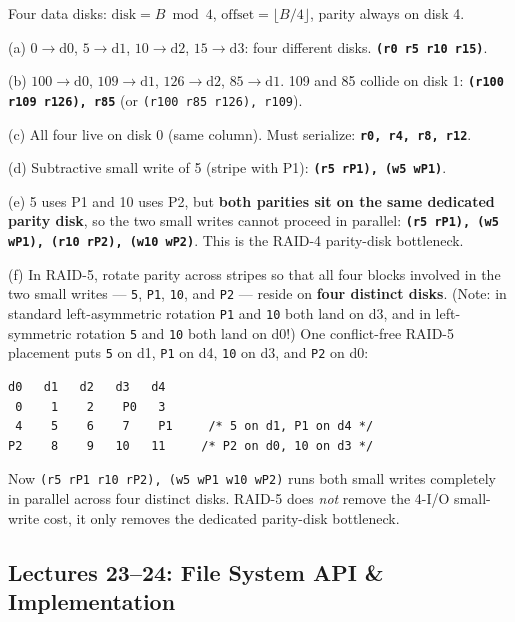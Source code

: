 \documentclass[11pt,a4paper]{article}
\newenvironment{Sol}{%
  \begin{tcolorbox}[sboxstyle, title={Solution}]%
}{%
  \end{tcolorbox}\vspace{0.35em}%
}
\begin{document}
\begin{Sol}
Four data disks: $\mathrm{disk}=B \bmod 4$,
$\mathrm{offset}=\lfloor B/4\rfloor$, parity always on disk 4.

(a) $0\to\mathrm{d0}$, $5\to\mathrm{d1}$, $10\to\mathrm{d2}$,
$15\to\mathrm{d3}$: four different disks.
\textbf{\texttt{(r0 r5 r10 r15)}}.

(b) $100\to\mathrm{d0}$, $109\to\mathrm{d1}$, $126\to\mathrm{d2}$,
$85\to\mathrm{d1}$. 109 and 85 collide on disk 1:
\textbf{\texttt{(r100 r109 r126), r85}}
(or \texttt{(r100 r85 r126), r109}).

(c) All four live on disk 0 (same column). Must serialize:
\textbf{\texttt{r0, r4, r8, r12}}.

(d) Subtractive small write of 5 (stripe with P1):
\textbf{\texttt{(r5 rP1), (w5 wP1)}}.

(e) 5 uses P1 and 10 uses P2, but \textbf{both parities sit on the same
dedicated parity disk}, so the two small writes cannot proceed in
parallel:
\textbf{\texttt{(r5 rP1), (w5 wP1), (r10 rP2), (w10 wP2)}}.
This is the RAID-4 parity-disk bottleneck.

(f) In RAID-5, rotate parity across stripes so that all four blocks
involved in the two small writes --- \texttt{5}, \texttt{P1},
\texttt{10}, and \texttt{P2} --- reside on \textbf{four distinct disks}.
(Note: in standard left-asymmetric rotation \texttt{P1} and \texttt{10}
both land on d3, and in left-symmetric rotation \texttt{5} and
\texttt{10} both land on d0!) One conflict-free RAID-5 placement
puts \texttt{5} on d1, \texttt{P1} on d4, \texttt{10} on d3, and
\texttt{P2} on d0:
\begin{lstlisting}[numbers=none]
d0   d1   d2   d3   d4
 0    1    2    P0   3
 4    5    6    7    P1     /* 5 on d1, P1 on d4 */
P2    8    9   10   11     /* P2 on d0, 10 on d3 */
\end{lstlisting}
Now \texttt{(r5 rP1 r10 rP2), (w5 wP1 w10 wP2)} runs both small writes
completely in parallel across four distinct disks. RAID-5 does
\emph{not} remove the 4-I/O small-write cost, it only removes the
dedicated parity-disk bottleneck.
\end{Sol}

\subsection{Lectures 23--24: File System API \& Implementation}
\end{document}
